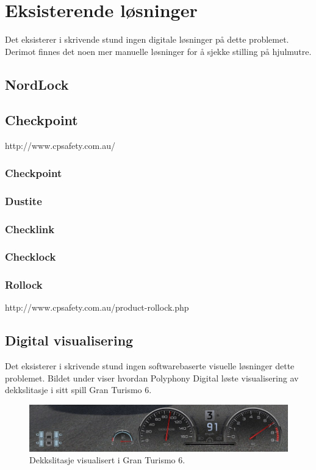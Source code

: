 \section{Eksisterende løsninger}
Det eksisterer i skrivende stund ingen digitale løsninger på dette problemet. 
Derimot finnes det noen mer manuelle løsninger for å sjekke stilling på hjulmutre.
\subsection{NordLock}
\subsection{Checkpoint}
http://www.cpsafety.com.au/
\subsubsection{Checkpoint}
\subsubsection{Dustite}
\subsubsection{Checklink}
\subsubsection{Checklock}
\subsubsection{Rollock}
http://www.cpsafety.com.au/product-rollock.php

\subsection{Digital visualisering}
Det eksisterer i skrivende stund ingen softwarebaserte visuelle løsninger dette 
problemet. Bildet under viser hvordan Polyphony Digital løste visualisering av 
dekkslitasje i sitt spill Gran Turismo 6. 
	\newline
	\begin{figure}[H]
		\centering
		\includegraphics[width=1.00\textwidth]{images/gran-turismo-6-screenshot.jpg}
		\caption{Dekkslitasje visualisert i Gran Turismo 6.}
	\end{figure}
